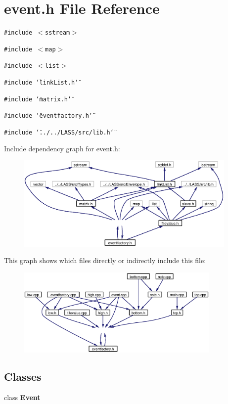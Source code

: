 \section{event.h File Reference}
\label{event_8h}
{\tt \#include $<$sstream$>$}\par
{\tt \#include $<$map$>$}\par
{\tt \#include $<$list$>$}\par
{\tt \#include \char`\"{}link\-List.h\char`\"{}}\par
{\tt \#include \char`\"{}matrix.h\char`\"{}}\par
{\tt \#include \char`\"{}eventfactory.h\char`\"{}}\par
{\tt \#include \char`\"{}../../LASS/src/lib.h\char`\"{}}\par


Include dependency graph for event.h:\begin{figure}[H]
\begin{center}
\leavevmode
\includegraphics[width=304pt]{event_8h__incl}
\end{center}
\end{figure}


This graph shows which files directly or indirectly include this file:\begin{figure}[H]
\begin{center}
\leavevmode
\includegraphics[width=281pt]{event_8h__dep__incl}
\end{center}
\end{figure}
\subsection*{Classes}
\begin{CompactItemize}
\item 
class {\bf Event}
\end{CompactItemize}
